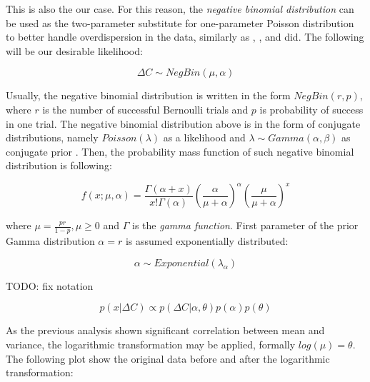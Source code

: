 \documentclass[
  digital, %
  table,   %
  twoside, %
  12pt,
  lof,     %
  lot,     %
]{fithesis3}
\begin{document}
This is also the our case. 
For this reason, the \textit{negative binomial distribution} can 
be used as the two-parameter substitute for 
one-parameter Poisson distribution to better 
handle overdispersion in the data, similarly 
as \cite{simone2020}, \cite{wallinga2004}, 
\cite{alzahrani2018} and \cite{manevski2020} did.
The following will be our desirable likelihood:

\begin{equation}
\Delta C \sim NegBin\left( \mu, \alpha \right)
\end{equation}

Usually, the negative binomial distribution is 
written in the form $NegBin \left( r, p \right)$, 
where $r$ is the number of successful Bernoulli 
trials and $p$ is probability of success in one 
trial. The negative binomial distribution above 
is in the form of conjugate distributions, namely 
$Poisson\left( \lambda \right)$ as a likelihood 
and $\lambda \sim Gamma\left( \alpha, \beta \right)$ as 
conjugate prior \cite{munezero2020}. 
Then, the probability mass function of such 
negative binomial distribution is following:

\begin{equation}
f \left( x; \mu, \alpha \right) = \frac{\Gamma \left( \alpha + x \right) }{x! \Gamma \left( \alpha \right)} \left( \frac{\alpha}{\mu + \alpha} \right)^{\alpha} \left( \frac{\mu}{\mu + \alpha} \right)^{x}
\end{equation}

where $\mu = \frac{pr}{1-p}, \mu \geq 0$ and 
$\Gamma$ is the \textit{gamma function}. 
First parameter of the prior Gamma distribution 
$\alpha = r$ is assumed exponentially distributed:

\begin{equation}
	\alpha \sim Exponential \left( \lambda_{\alpha} \right)
\end{equation}

TODO: fix notation

\begin{equation}
p(x|\Delta C) \propto p(\Delta C|\alpha, \theta) p(\alpha) p(\theta)
\end{equation}

As the previous analysis shown significant 
correlation between mean and variance, the 
logarithmic transformation may be applied, 
formally $log\left( \mu \right) = \theta$. 
The following plot show the original data 
before and after the logarithmic transformation:
\end{document}
